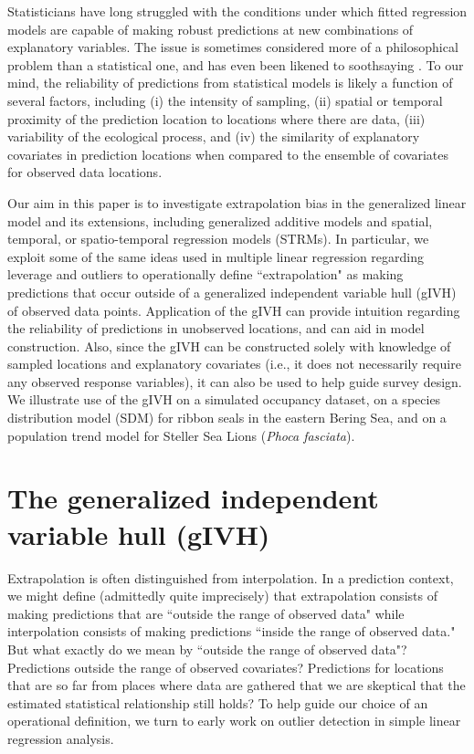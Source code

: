 \documentclass[12pt,english]{article}
\begin{document}
\begin{spacing}{1.9}
Statisticians have long struggled with the conditions under which fitted regression models are capable of
making robust predictions at new combinations of explanatory variables.  The issue is sometimes considered more of a
philosophical problem than a statistical one, and has even been likened to soothsaying \citep{EhrenbergBound1993}.  To our mind, the reliability of predictions from statistical models is likely a function of several factors, including (i) the intensity of sampling,
(ii) spatial or temporal proximity of the prediction location to locations where there are data, (iii) variability of the ecological process, and (iv) the similarity of explanatory covariates in prediction locations when compared to the ensemble of covariates for observed data locations.

Our aim in this paper is to investigate extrapolation bias in the generalized linear model and its extensions, including generalized additive models \citep[GAMs;][]{HastieTibshirani1999,Wood2006} and spatial, temporal, or spatio-temporal regression models (STRMs).  In particular, we exploit some of the same ideas used in multiple linear regression regarding leverage and outliers \citep{Cook1979} to operationally define ``extrapolation" as making predictions that occur outside of a generalized independent variable hull (gIVH) of observed data points. Application of the gIVH can provide intuition regarding the reliability of predictions in unobserved locations, and can aid in model construction.  Also, since the gIVH can be constructed solely with knowledge of sampled locations and explanatory covariates (i.e., it does not necessarily require any observed response variables), it can also be used to help guide survey design. We illustrate use of the gIVH on a simulated occupancy dataset, on a species distribution model (SDM) for ribbon seals in the eastern Bering Sea, and on a population trend model for Steller Sea Lions ({\it Phoca fasciata}).

\section{The generalized independent variable hull (gIVH)}

Extrapolation is often distinguished from interpolation.  In a prediction context, we might define (admittedly quite imprecisely) that extrapolation consists of making predictions that are ``outside the range of observed data" while interpolation consists of making predictions ``inside the range of observed data."  But what exactly do we mean by ``outside the range of observed data"?  Predictions outside the range of observed covariates?  Predictions for locations that are so far from places where data are gathered that we are skeptical that the estimated statistical relationship still holds? To help guide our choice of an operational definition, we turn to early work on outlier detection in simple linear regression analysis.


\end{spacing}
\end{document}
